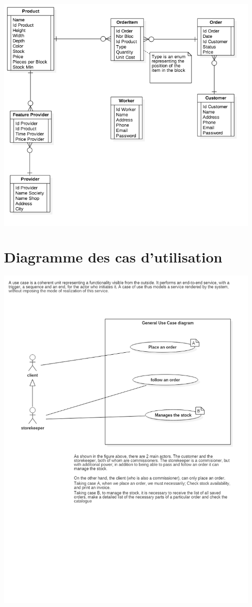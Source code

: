 \documentclass{ecam}
\begin{document}
\begin{center}

\includegraphics[angle=0,scale=0.3]{../images/ERDDiagram.png}

\end{center}

\section{Diagramme des cas d'utilisation}
\begin{center}

\includegraphics[angle=0,scale=0.3]{../images/use-case-diagram.png}
\end{center}
\end{document}
